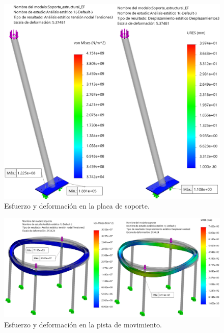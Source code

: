 \begin{figure}[H]
	\centering
	\includegraphics[width=12cm]{imagenes/val_rol2}
	\caption{Esfuerzo y deformación en la placa de soporte.}
	\label{fig:val_rol2}
\end{figure}

\begin{figure}[H]
	\centering
	\includegraphics[width=\columnwidth]{imagenes/val_rol3}
	\caption{Esfuerzo y deformación en la pista de movimiento.}
	\label{fig:val_rol3}
\end{figure}

